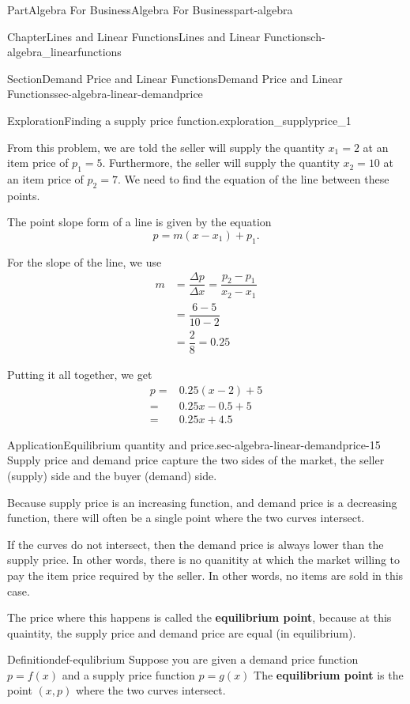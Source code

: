 \documentclass{tufte-book}
\newcommand{\terminology}[1]{\textbf{#1}}
\numberwithin{equation}{chapter}
\newcommand{\amp}{&}
\begin{document}
\begin{partptx}{Part}{Algebra For Business}{}{Algebra For Business}{}{}{part-algebra}
\begin{chapterptx}{Chapter}{Lines and Linear Functions}{}{Lines and Linear Functions}{}{}{ch-algebra_linearfunctions}
\begin{sectionptx}{Section}{Demand Price and Linear Functions}{}{Demand Price and Linear Functions}{}{}{sec-algebra-linear-demandprice}
\begin{exploration}{Exploration}{Finding a supply price function.}{exploration_supplyprice_1}
\par
From this problem, we are told the seller will supply the quantity \(x_1=2\) at an item price of \(p_1 = 5\).  Furthermore, the seller will supply the quantity \(x_2=10\) at an item price of \(p_2=7\).  We need to find the equation of the line between these points.%
\par
The point slope form of a line is given by the equation%
\begin{equation*}
p = m (x- x_1) + p_1\text{.}
\end{equation*}
%
\par
For the slope of the line, we use%
\begin{align*}
m \amp = \dfrac{\Delta p}{\Delta x} = \dfrac{p_2-p_1}{x_2-x_1}\\
\amp = \dfrac{6-5}{10-2}\\
\amp = \dfrac{2}{8}= 0.25
\end{align*}
%
\par
Putting it all together, we get%
\begin{align*}
p = \amp 0.25 (x-2) + 5\\
= \amp 0.25x - 0.5 + 5\\
= \amp 0.25x + 4.5
\end{align*}
%
\end{exploration}%
\begin{insight}{Application}{Equilibrium quantity and price.}{sec-algebra-linear-demandprice-15}%
Supply price and demand price capture the two sides of the market, the seller (supply) side and the buyer (demand) side.%
\par
Because supply price is an increasing function, and demand price is a decreasing function, there will often be a single point where the two curves intersect.%
\par
If the curves do not intersect, then the demand price is always lower than the supply price. In other words, there is no quanitity at which the market  willing to pay the item price required by  the seller.  In other words, no items are sold in this case.%
\par
The price where this happens is called the \terminology{equilibrium point}, because at this quaintity, the supply price and demand price are equal (in equilibrium).%
\end{insight}
\begin{definition}{Definition}{}{def-equlibrium}%
Suppose you are given a demand price function \(p = f(x)\) and a supply price function \(p=g(x)\) The \terminology{equilibrium  point} is the point \((x,p)\) where the two curves intersect.%

\end{definition}
\end{sectionptx}
\end{chapterptx}
\end{partptx}
\end{document}
